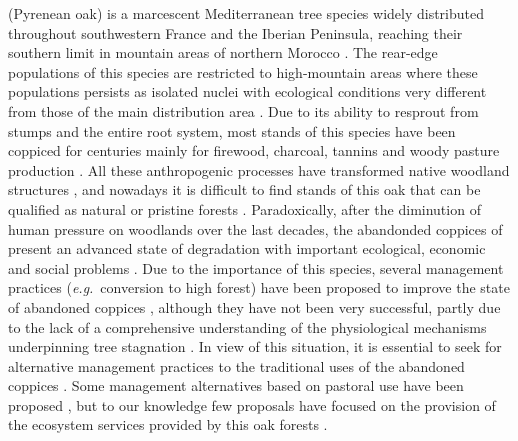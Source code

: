 \Qp (Pyrenean oak) is a marcescent Mediterranean tree species widely distributed throughout southwestern France and the Iberian Peninsula, reaching their southern limit in mountain areas of northern Morocco \autocite{Franco1990Quercus}. The rear-edge populations of this species are restricted to high-mountain areas where these populations persists as isolated nuclei with ecological conditions very different from those of the main distribution area \autocite{PerezLuqueetal2021EcologicalDiversity}. Due to its ability to resprout from stumps and the entire root system, most stands of this species have been coppiced for centuries mainly for firewood, charcoal, tannins and woody pasture production \autocite{SanchezPalomaresetal2008EstacionesEcologicas,XimenezdeEmbun1961MonteBajo}. All these anthropogenic processes have transformed native woodland structures \autocite{Tarregaetal2006ForestStructure}, and nowadays it is difficult to find stands of this oak that can be qualified as natural or pristine forests \autocite{RuizdelaTorre2006FloraMayor}. Paradoxically, after the diminution of human pressure on woodlands over the last decades, the abandonded coppices of \Qp present an advanced state of degradation with important ecological, economic and social problems \autocite{Bravoetal2008SelviculturaMontes,MontoyaMeson1979SituacionActual,Piqueetal2018Spain,PiqueVericat2015EvolutionPerspectives,Vericatetal2012GestionAdaptativa}. Due to the importance of this species, several management practices (\emph{e.g.}~conversion to high forest) have been proposed to improve the state of abandoned coppices \autocite{Bravoetal2008SelviculturaMontes,Montoya1982SelviculturaOrdenacion,Montoya1983UsosAlternativos,Serradaetal1992CoppiceSystem,Vericatetal2012GestionAdaptativa}, although they have not been very successful, partly due to the lack of a comprehensive understanding of the physiological mechanisms underpinning tree stagnation \autocite{Salomonetal2017GeneralFailure,ValbuenaCarabanaGil2017CentenaryCoppicing}. In view of this situation, it is essential to seek for alternative management practices to the traditional uses of the abandoned coppices \autocite{MesonMontoya1985VegetacionForestal,SanMigueletal2012BosquesMatorrales}. Some management alternatives based on pastoral use have been proposed \autocite{HerreraCalvo2016UsoPastoral}, but to our knowledge few proposals have focused on the provision of the ecosystem services provided by this oak forests \autocites[but see][]{Piqueetal2018Spain,PiqueVericat2015EvolutionPerspectives}.

